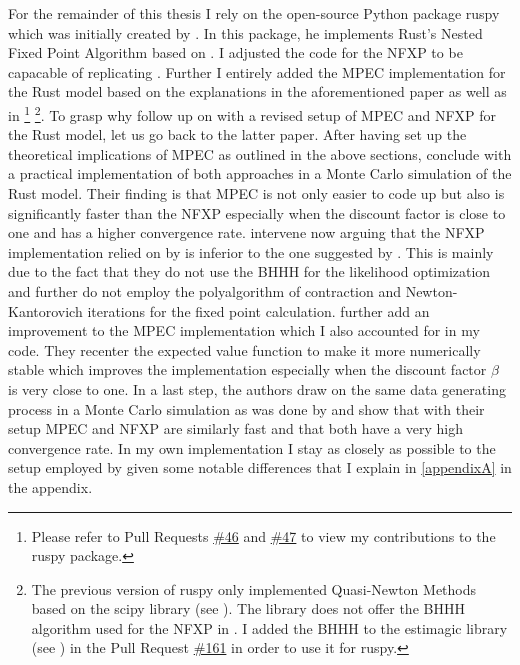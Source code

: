 For the remainder of this thesis I rely on the open-source Python package ruspy which was initially created by \cite{Blesch.2019}. In this package, he implements Rust's Nested Fixed Point Algorithm based on \cite{Rust.2000}. I adjusted the code for the NFXP to be capacable of replicating \cite{Iskhakov.2016}. Further I entirely added the MPEC implementation for the Rust model based on the explanations in the aforementioned paper as well as in \cite{Su.Judd.2012} \footnote{Please refer to Pull Requests \href{https://github.com/OpenSourceEconomics/ruspy/pull/46}{\#46} and \href{https://github.com/OpenSourceEconomics/ruspy/pull/47}{\#47} to view my contributions to the ruspy package.} \footnote{The previous version of ruspy only implemented Quasi-Newton Methods based on the scipy library (see \cite{scipy.2020}). The library does not offer the BHHH algorithm used for the NFXP in \cite{Iskhakov.2016}. I added the BHHH to the estimagic library (see \cite{Gabler.2019}) in the Pull Request \href{https://github.com/OpenSourceEconomics/estimagic/pull/161}{\#161} in order to use it for ruspy.}. To grasp why \citeauthor{Iskhakov.2016} follow up on \citeauthor{Su.Judd.2012} with a revised setup of MPEC and NFXP for the Rust model, let us go back to the latter paper. After having set up the theoretical implications of MPEC as outlined in the above sections, \citeauthor{Su.Judd.2012} conclude with a practical implementation of both approaches in a Monte Carlo simulation of the Rust model. Their finding is that MPEC is not only easier to code up but also is significantly faster than the NFXP especially when the discount factor is close to one and has a higher convergence rate. \citeauthor{Iskhakov.2016} intervene now arguing that the NFXP implementation relied on by \citeauthor{Su.Judd.2012} is inferior to the one suggested by \cite{Rust.2000}. This is mainly due to the fact that they do not use the BHHH for the likelihood optimization and further do not employ the polyalgorithm of contraction and Newton-Kantorovich iterations for the fixed point calculation. \citeauthor{Iskhakov.2016} further add an improvement to the MPEC implementation which I also accounted for in my code. They recenter the expected value function to make it more numerically stable which improves the implementation especially when the discount factor $\beta$ is very close to one. In a last step, the authors draw on the same data generating process in a Monte Carlo simulation as was done by \citeauthor{Su.Judd.2012} and show that with their setup MPEC and NFXP are similarly fast and that both have a very high convergence rate. In my own implementation I stay as closely as possible to the setup employed by \citeauthor{Iskhakov.2016} given some notable differences that I explain in \ref{appendixA} in the appendix. 

